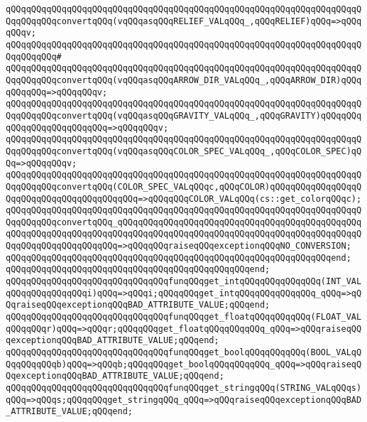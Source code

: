 \verb|qQQqqQQqqQQqqQQqqQQqqQQqqQQqqQQqqQQqqQQqqQQqqQQqqQQqqQQqqQQqqQQqqQQqqQQqqQQqqQQqconvertqQQq(vqQQqasqQQqRELIEF_VALqQQq_,qQQqRELIEF)qQQq=>qQQqqQQqv;|\newline
\verb|qQQqqQQqqQQqqQQqqQQqqQQqqQQqqQQqqQQqqQQqqQQqqQQqqQQqqQQqqQQqqQQqqQQqqQQqqQQqqQQq#|\newline
\verb|qQQqqQQqqQQqqQQqqQQqqQQqqQQqqQQqqQQqqQQqqQQqqQQqqQQqqQQqqQQqqQQqqQQqqQQqqQQqqQQqconvertqQQq(vqQQqasqQQqARROW_DIR_VALqQQq_,qQQqARROW_DIR)qQQqqQQqqQQq=>qQQqqQQqv;|\newline
\verb|qQQqqQQqqQQqqQQqqQQqqQQqqQQqqQQqqQQqqQQqqQQqqQQqqQQqqQQqqQQqqQQqqQQqqQQqqQQqqQQqconvertqQQq(vqQQqasqQQqGRAVITY_VALqQQq_,qQQqGRAVITY)qQQqqQQqqQQqqQQqqQQqqQQqqQQq=>qQQqqQQqv;|\newline
\verb|qQQqqQQqqQQqqQQqqQQqqQQqqQQqqQQqqQQqqQQqqQQqqQQqqQQqqQQqqQQqqQQqqQQqqQQqqQQqqQQqconvertqQQq(vqQQqasqQQqCOLOR_SPEC_VALqQQq_,qQQqCOLOR_SPEC)qQQq=>qQQqqQQqv;|\newline
\verb|qQQqqQQqqQQqqQQqqQQqqQQqqQQqqQQqqQQqqQQqqQQqqQQqqQQqqQQqqQQqqQQqqQQqqQQqqQQqqQQqconvertqQQq(COLOR_SPEC_VALqQQqc,qQQqCOLOR)qQQqqQQqqQQqqQQqqQQqqQQqqQQqqQQqqQQqqQQqqQQq=>qQQqqQQqCOLOR_VALqQQq(cs::get_colorqQQqc);|\newline
\verb|qQQqqQQqqQQqqQQqqQQqqQQqqQQqqQQqqQQqqQQqqQQqqQQqqQQqqQQqqQQqqQQqqQQqqQQqqQQqqQQqconvertqQQq_qQQqqQQqqQQqqQQqqQQqqQQqqQQqqQQqqQQqqQQqqQQqqQQqqQQqqQQqqQQqqQQqqQQqqQQqqQQqqQQqqQQqqQQqqQQqqQQqqQQqqQQqqQQqqQQqqQQqqQQqqQQqqQQqqQQqqQQqqQQq=>qQQqqQQqraiseqQQqexceptionqQQqNO_CONVERSION;|\newline
\verb|qQQqqQQqqQQqqQQqqQQqqQQqqQQqqQQqqQQqqQQqqQQqqQQqqQQqqQQqqQQqqQQqend;|\newline
\verb|qQQqqQQqqQQqqQQqqQQqqQQqqQQqqQQqqQQqqQQqqQQqqQQqend;|\newline
\newline
\verb|qQQqqQQqqQQqqQQqqQQqqQQqqQQqqQQqfunqQQqget_intqQQqqQQqqQQqqQQq(INT_VALqQQqqQQqqQQqqQQqi)qQQq=>qQQqi;qQQqqQQqget_intqQQqqQQqqQQqqQQq_qQQq=>qQQqraiseqQQqexceptionqQQqBAD_ATTRIBUTE_VALUE;qQQqend;|\newline
\verb|qQQqqQQqqQQqqQQqqQQqqQQqqQQqqQQqfunqQQqget_floatqQQqqQQqqQQq(FLOAT_VALqQQqqQQqr)qQQq=>qQQqr;qQQqqQQqget_floatqQQqqQQqqQQq_qQQq=>qQQqraiseqQQqexceptionqQQqBAD_ATTRIBUTE_VALUE;qQQqend;|\newline
\verb|qQQqqQQqqQQqqQQqqQQqqQQqqQQqqQQqfunqQQqget_boolqQQqqQQqqQQq(BOOL_VALqQQqqQQqqQQqb)qQQq=>qQQqb;qQQqqQQqget_boolqQQqqQQqqQQq_qQQq=>qQQqraiseqQQqexceptionqQQqBAD_ATTRIBUTE_VALUE;qQQqend;|\newline
\verb|qQQqqQQqqQQqqQQqqQQqqQQqqQQqqQQqfunqQQqget_stringqQQq(STRING_VALqQQqs)qQQq=>qQQqs;qQQqqQQqget_stringqQQq_qQQq=>qQQqraiseqQQqexceptionqQQqBAD_ATTRIBUTE_VALUE;qQQqend;|\newline
